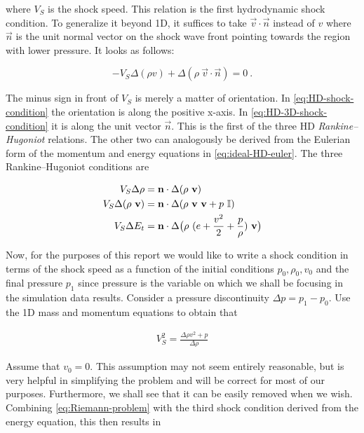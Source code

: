 where $V_S$ is the shock speed. This relation is the first hydrodynamic shock condition. To generalize it beyond 1D, it suffices to take $\vec{v} \cdot \vec{n}$ instead of $v$ where $\vec{n}$ is the unit normal vector on the shock wave front pointing towards the region with lower pressure. It looks as follows:

\begin{equation}
\label{eq:HD-3D-shock-condition}
- V_S \Delta(\rho v) + \Delta(\rho \ \vec{v} \cdot \vec{n}) = 0 \ .
\end{equation}

The minus sign in front of $V_S$ is merely a matter of orientation. In \cref{eq:HD-shock-condition} the orientation is along the positive x-axis. In \cref{eq:HD-3D-shock-condition} it is along the unit vector $\vec{n}$. This is the first of the three HD \textit{Rankine–Hugoniot} relations. The other two can analogously be derived from the Eulerian form of the momentum and energy equations in \cref{eq:ideal-HD-euler}. The three Rankine–Hugoniot conditions are

\begin{equation}
\label{HD-shock-conditions}
\begin{split}
V_S \Delta \rho &= \vec{n}\cdot\Delta(\rho \ \vec{v})\\
V_S \Delta (\rho \ \vec{v}) &= \vec{n} \cdot \Delta(\rho \ \vec{v} \ \vec{v} + p \ \I) \\
V_S \Delta E_t &= \vec{n} \cdot \Delta \big (\rho \ (e + \frac{v^2}{2} + \frac{p}{\rho}) \ \vec{v} \big)
\end{split}
\end{equation}


Now, for the purposes of this report we would like to write a shock condition in terms of the shock speed as a function of the initial conditions $p_0, \rho_0, v_0$ and the final pressure $p_1$ since pressure is the variable on which we shall be focusing in the simulation data results. Consider a pressure discontinuity $\Delta p = p_1 - p_0$. Use the 1D mass and momentum equations to obtain that

\begin{equation}
\label{eq:Riemann-problem}
\begin{split}
V_S^2 = \frac{\Delta \rho v^2 + p}{\Delta \rho}   
\end{split}
\end{equation}

Assume that $v_0 = 0$. This assumption may not seem entirely reasonable, but is very helpful in simplifying the problem and will be correct for most of our purposes. Furthermore, we shall see that it can be easily removed when we wish. Combining \cref{eq:Riemann-problem} with the third shock condition derived from the energy equation, this then results in 

